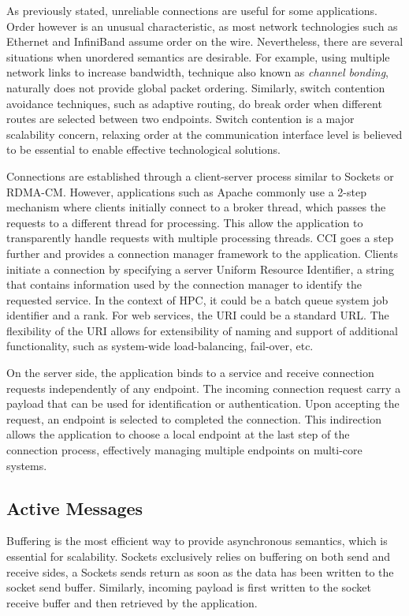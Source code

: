 As previously stated, unreliable connections are useful for some applications. 
Order however is an unusual characteristic, as most network technologies such 
as Ethernet and InfiniBand assume order on the wire. 
Nevertheless, there are several situations when unordered semantics are 
desirable. For example, using multiple network links to increase bandwidth, 
technique also known as \emph{channel bonding}, naturally does not provide 
global packet ordering. Similarly, switch contention avoidance techniques, 
such as adaptive routing, do break order when different routes are selected 
between two endpoints. Switch contention is a major scalability concern, 
relaxing order at the communication interface level is believed to be 
essential to enable effective technological solutions.

Connections are established through a client-server process similar to 
Sockets or RDMA-CM\cite{rdma-cm}. However, applications such as 
Apache\cite{apache} commonly use a 2-step mechanism where clients 
initially connect to a broker thread, which passes the requests to a 
different thread for processing. This allow the application to 
transparently handle requests with multiple processing threads.
CCI goes a step further and provides a connection manager framework to 
the application. Clients initiate a connection by specifying a server 
Uniform Resource Identifier, a string that contains information used 
by the connection manager to identify the requested service. In the context of 
HPC, it could be a batch queue system job identifier and a rank. For web 
services, the URI could be a standard URL. The flexibility of the URI allows 
for extensibility of naming and support of additional functionality, such as 
system-wide load-balancing, fail-over, etc.

On the server side, the application binds to a service and receive 
connection requests independently of any endpoint. The incoming connection 
request carry a payload that can be used for identification or authentication. 
Upon accepting the request, an endpoint is selected to completed the 
connection. This indirection allows the application to choose a local endpoint 
at the last step of the connection process, effectively managing multiple 
endpoints on multi-core systems.

\subsection{Active Messages}
Buffering is the most efficient way to provide asynchronous semantics, which 
is essential for scalability. Sockets exclusively relies on buffering on both 
send and receive sides, a Sockets sends return as soon as the data has been 
written to the socket send buffer. Similarly, incoming payload is first 
written to the socket receive buffer and then retrieved by the application.

